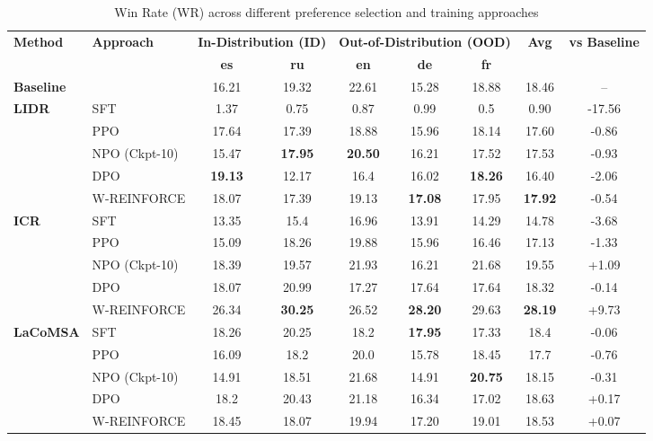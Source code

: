 \begin{table}[t]
\centering
\scriptsize
\setlength{\tabcolsep}{6pt}
\renewcommand{\arraystretch}{1.15}
\begin{tabular}{ll|cc|ccc|cc}
\toprule
\multirow{2}{*}{\textbf{Method}} & \multirow{2}{*}{\textbf{Approach}} & \multicolumn{2}{c|}{\textbf{In-Distribution (ID)}} & \multicolumn{3}{c|}{\textbf{Out-of-Distribution (OOD)}} & \multirow{2}{*}{\textbf{Avg}} & \multirow{2}{*}{\textbf{vs Baseline}} \\
 &  & \textbf{es} & \textbf{ru} & \textbf{en} & \textbf{de} & \textbf{fr} &  &  \\
\midrule
\textbf{Baseline} &  & 16.21 & 19.32 & 22.61 & 15.28 & 18.88 & 18.46 & -- \\
\midrule
\multirow{5}{*}{\textbf{LIDR}} & SFT & 1.37 & 0.75 & 0.87 & 0.99 & 0.5 & 0.90 & -17.56 \\
  & PPO & 17.64 & 17.39 & 18.88 & 15.96 & 18.14 & 17.60 & -0.86 \\
  & NPO (Ckpt-10) & 15.47 & \textbf{17.95} & \textbf{20.50} & 16.21 & 17.52 & 17.53 & -0.93 \\
  & DPO & \textbf{19.13} & 12.17 & 16.4 & 16.02 & \textbf{18.26} & 16.40 & -2.06 \\
  & W-REINFORCE & 18.07 & 17.39 & 19.13 & \textbf{17.08} & 17.95 & \textbf{17.92} & -0.54 \\
\midrule
\multirow{5}{*}{\textbf{ICR}} & SFT & 13.35 & 15.4 & 16.96 & 13.91 & 14.29 & 14.78 & -3.68 \\
  & PPO & 15.09 & 18.26 & 19.88 & 15.96 & 16.46 & 17.13 & -1.33 \\
  & NPO (Ckpt-10) & 18.39 & 19.57 & 21.93 & 16.21 & 21.68 & 19.55 & +1.09 \\
  & DPO & 18.07 & 20.99 & 17.27 & 17.64 & 17.64 & 18.32 & -0.14 \\
  & W-REINFORCE & 26.34 & \textbf{30.25} & 26.52 & \textbf{28.20} & 29.63 & \textbf{28.19} & +9.73 \\
\midrule
\multirow{5}{*}{\textbf{LaCoMSA}} & SFT & 18.26 & 20.25 & 18.2 & \textbf{17.95} & 17.33 & 18.4 & -0.06 \\
  & PPO & 16.09 & 18.2 & 20.0 & 15.78 & 18.45 & 17.7 & -0.76 \\
  & NPO (Ckpt-10) & 14.91 & 18.51 & 21.68 & 14.91 & \textbf{20.75} & 18.15 & -0.31 \\
  & DPO & 18.2 & 20.43 & 21.18 & 16.34 & 17.02 & 18.63 & +0.17 \\
  & W-REINFORCE & 18.45 & 18.07 & 19.94 & 17.20 & 19.01 & 18.53 & +0.07 \\
\bottomrule
\end{tabular}
\caption{Win Rate (WR) across different preference selection and training approaches}
\label{tab:methods_comparison_wr}
\end{table}
